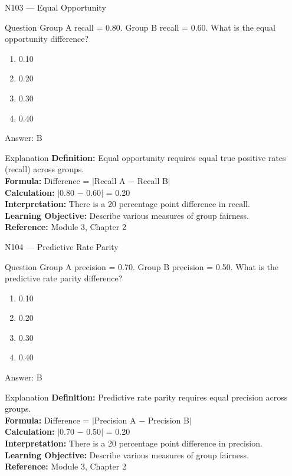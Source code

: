 \documentclass[aspectratio=169,8pt]{beamer}
\begin{document}
	\begin{frame}{N103 --- Equal Opportunity}
		\begin{block}{Question}
			Group A recall = 0.80. Group B recall = 0.60. What is the equal opportunity difference?
			\begin{enumerate}
				\item 0.10
				\item 0.20
				\item 0.30
				\item 0.40
			\end{enumerate}
		\end{block}
		\begin{exampleblock}{Answer: B}\end{exampleblock}
		\begin{block}{Explanation}
			\textbf{Definition:} Equal opportunity requires equal true positive rates (recall) across groups.\\
			\textbf{Formula:} Difference = $|$Recall A $-$ Recall B$|$\\
			\textbf{Calculation:} $|$0.80 $-$ 0.60$|$ = 0.20\\
			\textbf{Interpretation:} There is a 20 percentage point difference in recall.\\
			\textbf{Learning Objective:} Describe various measures of group fairness.\\
			\textbf{Reference:} Module 3, Chapter 2
		\end{block}
	\end{frame}
	
	\begin{frame}{N104 --- Predictive Rate Parity}
		\begin{block}{Question}
			Group A precision = 0.70. Group B precision = 0.50. What is the predictive rate parity difference?
			\begin{enumerate}
				\item 0.10
				\item 0.20
				\item 0.30
				\item 0.40
			\end{enumerate}
		\end{block}
		\begin{exampleblock}{Answer: B}\end{exampleblock}
		\begin{block}{Explanation}
			\textbf{Definition:} Predictive rate parity requires equal precision across groups.\\
			\textbf{Formula:} Difference = $|$Precision A $-$ Precision B$|$\\
			\textbf{Calculation:} $|$0.70 $-$ 0.50$|$ = 0.20\\
			\textbf{Interpretation:} There is a 20 percentage point difference in precision.\\
			\textbf{Learning Objective:} Describe various measures of group fairness.\\
			\textbf{Reference:} Module 3, Chapter 2
		\end{block}
	\end{frame}
	
\end{document}
